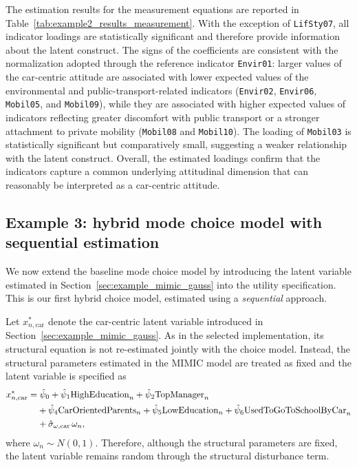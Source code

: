 \documentclass[12pt,a4paper]{article}
\newcommand{\highEducation}{\mathrm{HighEducation}}
\newcommand{\lowEducation}{\mathrm{LowEducation}}
\newcommand{\topManager}{\mathrm{TopManager}}
\newcommand{\carOrientedParents}{\mathrm{CarOrientedParents}}
\newcommand{\usedToGoToSchoolByCar}{\mathrm{UsedToGoToSchoolByCar}}
\begin{document}
The estimation results for the measurement equations are reported in
Table~\ref{tab:example2_results_measurement}. With the exception of
\texttt{LifSty07}, all indicator loadings are statistically
significant and therefore provide information about the latent
construct. The signs of the coefficients are consistent with the
normalization adopted through the reference indicator
\texttt{Envir01}: larger values of the car-centric attitude are
associated with lower expected values of the environmental and
public-transport-related indicators (\texttt{Envir02},
\texttt{Envir06}, \texttt{Mobil05}, and \texttt{Mobil09}), while they
are associated with higher expected values of indicators reflecting
greater discomfort with public transport or a stronger attachment to
private mobility (\texttt{Mobil08} and \texttt{Mobil10}). The loading
of \texttt{Mobil03} is statistically significant but comparatively
small, suggesting a weaker relationship with the latent construct.
Overall, the estimated loadings confirm that the indicators capture a
common underlying attitudinal dimension that can reasonably be
interpreted as a car-centric attitude.

\FloatBarrier

\subsection{Example 3: hybrid mode choice model with sequential estimation}
\label{sec:example_mode_lv_gauss_seq}

We now extend the baseline mode choice model by introducing the latent
variable estimated in Section~\ref{sec:example_mimic_gauss} into the
utility specification. This is our first hybrid choice model,
estimated using a \emph{sequential} approach.

Let \(x^*_{n,\text{car}}\) denote the car-centric latent variable
introduced in Section~\ref{sec:example_mimic_gauss}. As in the
selected implementation, its structural equation is not re-estimated
jointly with the choice model. Instead, the structural parameters
estimated in the MIMIC model are treated as fixed and the latent
variable is specified as
\begin{align}
  x^*_{n,\text{car}}
  =
  &\;
  \hat{\psi}_0
  + \hat{\psi}_1 \highEducation_n
  + \hat{\psi}_2 \topManager_n
  \notag \\
  &+
  \hat{\psi}_4 \carOrientedParents_n
  + \hat{\psi}_5 \lowEducation_n
  + \hat{\psi}_6 \usedToGoToSchoolByCar_n \notag\\
  &+ \hat{\sigma}_{\omega,\text{car}}\,\omega_n,
\end{align}
where \(\omega_n\sim N(0,1)\). Therefore, although the structural
parameters are fixed, the latent variable remains random through the
structural disturbance term.
\end{document}

